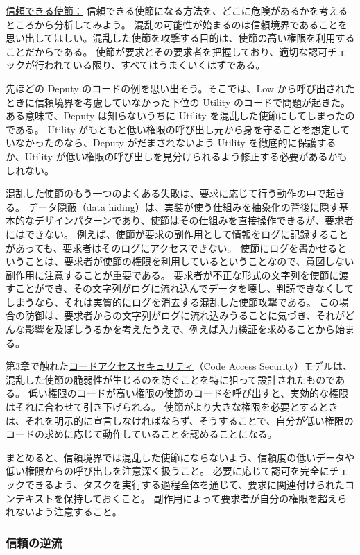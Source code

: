 \documentclass[uplatex]{jsarticle}
\begin{document}
\underline{信頼できる使節：}
信頼できる使節になる方法を、どこに危険があるかを考えるところから分析してみよう。
混乱の可能性が始まるのは信頼境界であることを思い出してほしい。混乱した使節を攻撃する目的は、使節の高い権限を利用することだからである。
使節が要求とその要求者を把握しており、適切な認可チェックが行われている限り、すべてはうまくいくはずである。

先ほどの Deputy のコードの例を思い出そう。そこでは、Low から呼び出されたときに信頼境界を考慮していなかった下位の Utility のコードで問題が起きた。
ある意味で、Deputy は知らないうちに Utility を混乱した使節にしてしまったのである。
Utility がもともと低い権限の呼び出し元から身を守ることを想定していなかったのなら、Deputy がだまされないよう Utility を徹底的に保護するか、Utility が低い権限の呼び出しを見分けられるよう修正する必要があるかもしれない。

混乱した使節のもう一つのよくある失敗は、要求に応じて行う動作の中で起きる。
\underline{データ隠蔽}（data hiding）は、実装が使う仕組みを抽象化の背後に隠す基本的なデザインパターンであり、使節はその仕組みを直接操作できるが、要求者にはできない。
例えば、使節が要求の副作用として情報をログに記録することがあっても、要求者はそのログにアクセスできない。
使節にログを書かせるということは、要求者が使節の権限を利用しているということなので、意図しない副作用に注意することが重要である。
要求者が不正な形式の文字列を使節に渡すことができ、その文字列がログに流れ込んでデータを壊し、判読できなくしてしまうなら、それは実質的にログを消去する混乱した使節攻撃である。
この場合の防御は、要求者からの文字列がログに流れ込みうることに気づき、それがどんな影響を及ぼしうるかを考えたうえで、例えば入力検証を求めることから始まる。

第3章で触れた\underline{コードアクセスセキュリティ}（Code Access Security）モデルは、混乱した使節の脆弱性が生じるのを防ぐことを特に狙って設計されたものである。
低い権限のコードが高い権限の使節のコードを呼び出すと、実効的な権限はそれに合わせて引き下げられる。
使節がより大きな権限を必要とするときは、それを明示的に宣言しなければならず、そうすることで、自分が低い権限のコードの求めに応じて動作していることを認めることになる。

まとめると、信頼境界では混乱した使節にならないよう、信頼度の低いデータや低い権限からの呼び出しを注意深く扱うこと。
必要に応じて認可を完全にチェックできるよう、タスクを実行する過程全体を通じて、要求に関連付けられたコンテキストを保持しておくこと。
副作用によって要求者が自分の権限を超えられないよう注意すること。

\subsubsection{信頼の逆流}
\end{document}
